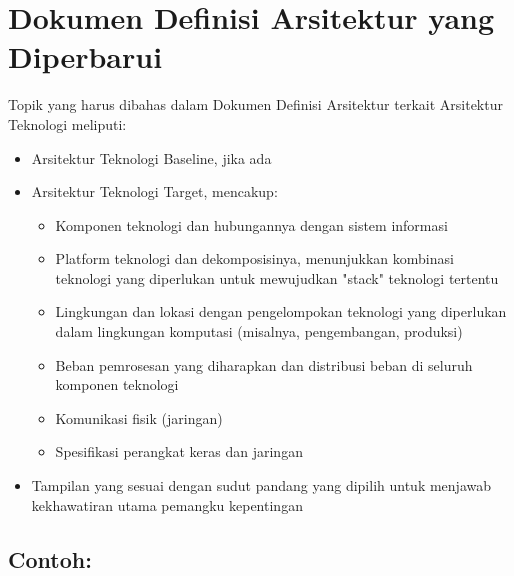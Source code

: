 \section{Dokumen Definisi Arsitektur yang Diperbarui}
\label{sec:dokumen_definisi_arsitektur_teknologi}
Topik yang harus dibahas dalam Dokumen Definisi Arsitektur terkait Arsitektur Teknologi meliputi:
\begin{itemize}
	\item Arsitektur Teknologi Baseline, jika ada 
	\item Arsitektur Teknologi Target, mencakup:
	\begin{itemize}
		\item Komponen teknologi dan hubungannya dengan sistem informasi
		\item Platform teknologi dan dekomposisinya, menunjukkan kombinasi teknologi yang diperlukan untuk mewujudkan "stack" teknologi tertentu
		\item Lingkungan dan lokasi dengan pengelompokan teknologi yang diperlukan dalam lingkungan komputasi (misalnya, pengembangan, produksi)
		\item Beban pemrosesan yang diharapkan dan distribusi beban di seluruh komponen teknologi
		\item Komunikasi fisik (jaringan)
		\item Spesifikasi perangkat keras dan jaringan
	\end{itemize}
	\item Tampilan yang sesuai dengan sudut pandang yang dipilih untuk menjawab kekhawatiran utama pemangku kepentingan
\end{itemize}

\subsection*{Contoh:}

